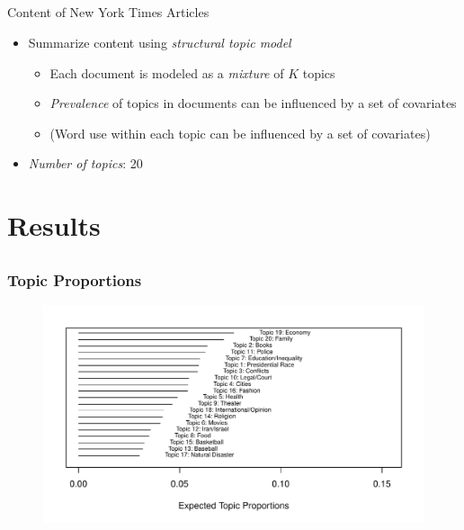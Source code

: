 \documentclass{beamer}
\begin{document}
\subsection{}
\begin{frame}{Content of New York Times Articles}
\begin{itemize}
\item Summarize content using \emph{structural topic model} \citep{roberts2014structural,roberts2014stm}
\begin{itemize}
\item Each document is modeled as a \emph{mixture} of $K$ topics
\item \emph{Prevalence} of topics in documents can be influenced by a set of covariates
\item (Word use within each topic can be influenced by a set of covariates)
\end{itemize}
\item \emph{Number of topics}: 20
\end{itemize}
\end{frame}

\section{Results}

\subsection{}
\begin{frame} %
  \frametitle{Topic Proportions}
  \begin{figure}
  \includegraphics[width = \textwidth]{../calc/fig/prop.pdf}
  \end{figure}
\end{frame}
\end{document}
